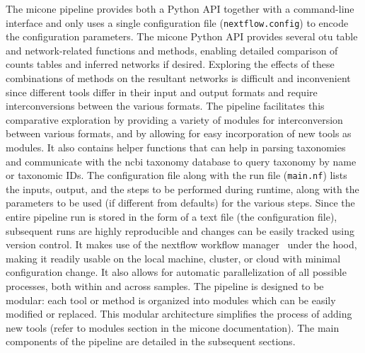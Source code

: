   The \ac{micone} pipeline provides both a Python API together with a command-line interface and only uses a single configuration file (\texttt{nextflow.config}) to encode the configuration parameters.
  The \ac{micone} Python API provides several \ac{otu} table and network-related functions and methods, enabling detailed comparison of counts tables and inferred networks if desired.
  Exploring the effects of these combinations of methods on the resultant networks is difficult and inconvenient since different tools differ in their input and output formats and require interconversions between the various formats.
  The pipeline facilitates this comparative exploration by providing a variety of modules for interconversion between various formats, and by allowing for easy incorporation of new tools as modules.
  It also contains helper functions that can help in parsing taxonomies and communicate with the \ac{ncbi} taxonomy database to query taxonomy by name or taxonomic IDs.
  The configuration file along with the run file (\texttt{main.nf}) lists the inputs, output, and the steps to be performed during runtime, along with the parameters to be used (if different from defaults) for the various steps.
  Since the entire pipeline run is stored in the form of a text file (the configuration file), subsequent runs are highly reproducible and changes can be easily tracked using version control.
  It makes use of the nextflow workflow manager~\cite{Tommaso2015} under the hood, making it readily usable on the local machine, cluster, or cloud with minimal configuration change.
  It also allows for automatic parallelization of all possible processes, both within and across samples.
  The pipeline is designed to be modular: each tool or method is organized into modules which can be easily modified or replaced.
  This modular architecture simplifies the process of adding new tools (refer to modules section in the \ac{micone} documentation).
  The main components of the pipeline are detailed in the subsequent sections.

